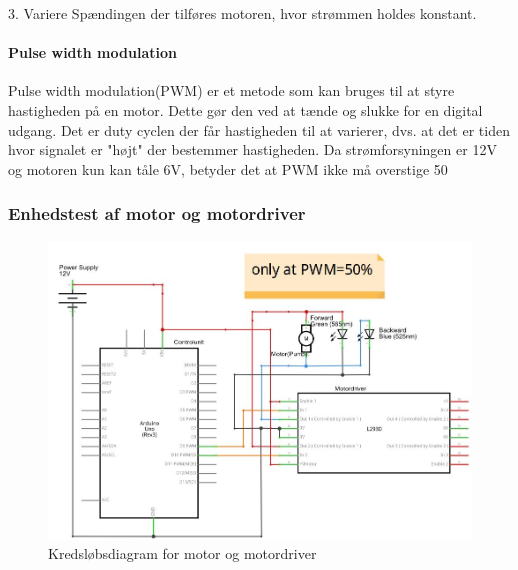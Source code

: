 3. Variere Spændingen der tilføres motoren, hvor strømmen holdes konstant.


\paragraph{Pulse width modulation} \phantom{mmmmmmmmmmmmmmmmmkkkkkkkkkkkkkkkkkkkkkkkkkkkkkkkkmmmmmmmmmmmmmmmmmmmmmm}

Pulse width modulation(PWM) er et metode som kan bruges til at styre hastigheden på en motor. Dette gør den ved at tænde og slukke for en digital udgang. Det er duty cyclen der får hastigheden til at varierer, dvs. at det er tiden hvor signalet er "højt" der bestemmer hastigheden. Da strømforsyningen er 12V og motoren kun kan tåle 6V, betyder det at PWM ikke må overstige 50%

\subsubsection{Enhedstest af motor og motordriver}

 \begin{figure}[H]
	\centering
	\includegraphics[width=1\textwidth]{billeder/Hardware/diagrammer/motordiagram.JPG}
	\caption{Kredsløbsdiagram for motor og motordriver}
	\label{fig:motordriverdiagram}
\end{figure}

